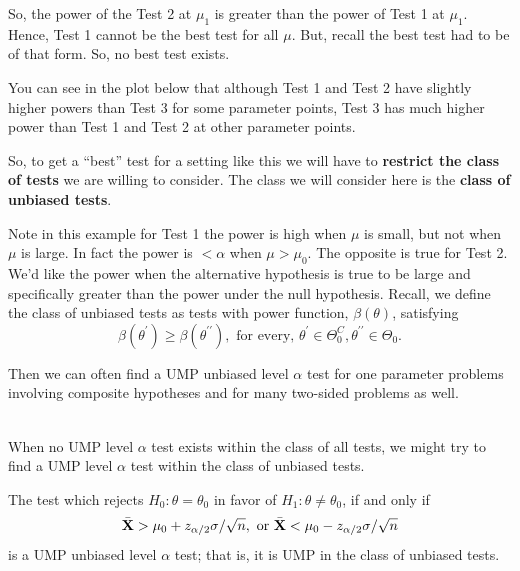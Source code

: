 \documentclass[11pt,]{article}
\def\bX{{\bf X}}
\def\bXbar{\bar{ \bX}}
\begin{document}
So, the power of the Test 2 at \(\mu_1\) is greater than the power of
Test 1 at \(\mu_1\). Hence, Test 1 cannot be the best test for all
\(\mu\). But, recall the best test had to be of that form. So, no best
test exists.

You can see in the plot below that although Test 1 and Test 2 have
slightly higher powers than Test 3 for some parameter points, Test 3 has
much higher power than Test 1 and Test 2 at other parameter points.

So, to get a ``best'' test for a setting like this we will have to
\textbf{restrict the class of tests} we are willing to consider. The
class we will consider here is the \textbf{class of unbiased tests}.

Note in this example for Test 1 the power is high when \(\mu\) is small,
but not when \(\mu\) is large. In fact the power is \(<\alpha\) when
\(\mu > \mu_0\). The opposite is true for Test 2. We'd like the power
when the alternative hypothesis is true to be large and specifically
greater than the power under the null hypothesis. Recall, we define the
class of unbiased tests as tests with power function, \(\beta(\theta)\),
satisfying
\[\beta(\theta^\prime)\geq \beta(\theta^{\prime\prime}), \mbox{ for every, } \theta^\prime \in \Theta_0^C, \theta^{\prime\prime}\in\Theta_0.\]

Then we can often find a UMP unbiased level \(\alpha\) test for one
parameter problems involving composite hypotheses and for many two-sided
problems as well.

\\
When no UMP level \(\alpha\) test exists within the class of all tests,
we might try to find a UMP level \(\alpha\) test within the class of
unbiased tests.

The test which rejects \(H_0: \theta = \theta_0\) in favor of
\(H_1: \theta \neq \theta_0\), if and only if
\[\bXbar > \mu_0 + z_{\alpha/2} \sigma/\sqrt{n}, \mbox{ or } \bXbar < \mu_0 - z_{\alpha/2} \sigma/\sqrt{n}\]
is a UMP unbiased level \(\alpha\) test; that is, it is UMP in the class
of unbiased tests.
\end{document}
